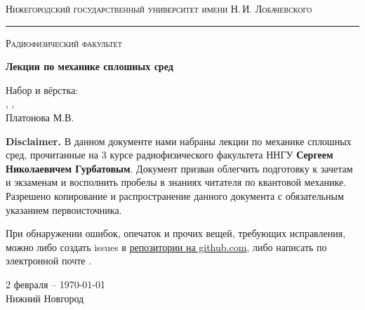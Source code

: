 \begin{titlepage}
\thispagestyle{empty}

\begin{center}
	{\small\textsc{Нижегородский государственный университет имени Н.\,И. Лобачевского}}
	\vskip 3pt \hrule \vskip 5pt
	{\small\textsc{Радиофизический факультет}}

	\vfill

	\begin{spacing}{2}
	{\Huge \bf  Лекции по механике сплошных сред}\\%
	\end{spacing}
	\vspace{1em}
	{ Набор и вёрстка:}\\[.5em]
	{ 
		\href{https://github.com/fedorsarafanov}{\color{black}{Сарафанов Ф.Г.}}, 
		\href{https://github.com/greengrocer98}{\color{black}{Есюнин М.В.}},
	\\ Платонова М.В.}\\[2em]
	\vspace{1em}
\end{center}

\textbf{Disclaimer.} В данном документе нами набраны лекции по механике сплошных сред, прочитанные на 3 курсе радиофизического факультета ННГУ \textbf{Сергеем Николаевичем Гурбатовым}. Документ призван облегчить подготовку к зачетам и экзаменам и восполнить пробелы в знаниях читателя по квантовой механике. Разрешено копирование и распространение данного документа с обязательным указанием первоисточника. 

При обнаружении ошибок, опечаток и прочих вещей, требующих исправления, можно либо создать issues в \href{https://github.com/FedorSarafanov/continuum-mechanics}{репозитории на github.com}, либо написать по электронной почте  \href{mailto:sfg180@yandex.ru}{\color{black}{sfg180@yandex.ru}}.

\begin{center}
	\vfill
	2 февраля -- \today\\Нижний Новгород
\end{center}

\end{titlepage}